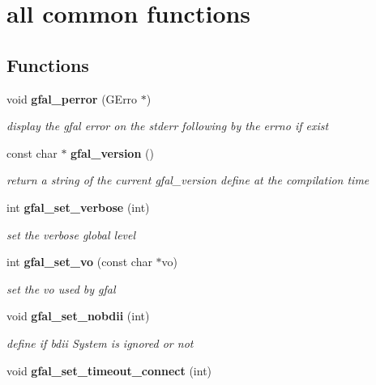 \section{all common functions}
\label{group__common__group}
\subsection*{Functions}
\begin{DoxyCompactItemize}
\item 
void {\bf gfal\_\-perror} (GErro $\ast$)
\begin{DoxyCompactList}\small\item\em display the gfal error on the stderr following by the errno if exist \item\end{DoxyCompactList}\item 
const char $\ast$ {\bf gfal\_\-version} ()\label{group__common__group_gaa469918e49f4c3194b8f42c87fdd8137}

\begin{DoxyCompactList}\small\item\em return a string of the current gfal\_\-version define at the compilation time \item\end{DoxyCompactList}\item 
int {\bf gfal\_\-set\_\-verbose} (int)
\begin{DoxyCompactList}\small\item\em set the verbose global level \item\end{DoxyCompactList}\item 
int {\bf gfal\_\-set\_\-vo} (const char $\ast$vo)\label{group__common__group_gacef0c28f0787235cf38a17442ebcd960}

\begin{DoxyCompactList}\small\item\em set the vo used by gfal \item\end{DoxyCompactList}\item 
void {\bf gfal\_\-set\_\-nobdii} (int)
\begin{DoxyCompactList}\small\item\em define if bdii System is ignored or not \item\end{DoxyCompactList}\item 
void {\bf gfal\_\-set\_\-timeout\_\-connect} (int)\label{group__common__group_gaf11091a5cce3f5cf4a74a4388977c103}


\end{DoxyCompactItemize}

